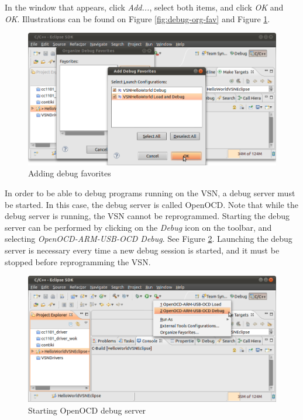 \documentclass[a4paper, 10pt]{article}
\begin{document}
In the window that appears, click \emph{Add...},
select both items, and click \emph{OK} and \emph{OK}. Illustrations can be found on 
Figure \ref{fig:debug-org-fav} and Figure \ref{fig:debug-add-fav}.

    \begin{figure}[H]
    \centering
        \includegraphics[width=\textwidth]{./png-install-guide/debug-add-fav.png}
        \caption{Adding debug favorites}
        \label{fig:debug-add-fav}
    \end{figure}

In order to be able to debug programs running on the VSN, 
a debug server must be started.
In this case, the debug server is called OpenOCD.
Note that while the debug server is running, the VSN cannot be reprogrammed.
Starting the debug server can be performed by clicking on the 
\emph{Debug} icon on the toolbar, and selecting
\emph{OpenOCD-ARM-USB-OCD Debug}.
See Figure \ref{fig:debug-openocd-start}.
Launching the debug server is necessary every time a new debug session is started,
and it must be stopped before reprogramming the VSN.

    \begin{figure}[H]
    \centering
        \includegraphics[width=\textwidth]{./png-install-guide/debug-openocd-start.png}
        \caption{Starting OpenOCD debug server}
        \label{fig:debug-openocd-start}
    \end{figure}
\end{document}
